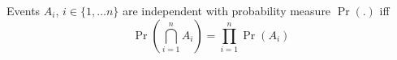 Events $A_i, \, i \in \{1, \dots n\}$ are independent with probability measure $\operatorname{Pr}(.)$ iff
$$\operatorname{Pr}(\bigcap\limits_{i=1}^n A_i) = \prod\limits_{i=1}^n \operatorname{Pr}(A_i)$$
